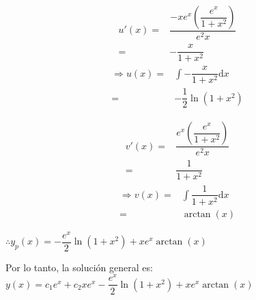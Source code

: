 \documentclass[fleqn]{article}
\begin{document}
\begin{enumerate}
        \begin{minipage}[t]{5cm}
            \begin{align*}
                u'(x) =& \dfrac{-xe^x \left(\dfrac{e^x}{1 + x^2} \right)}{e^2x} \\
                =& -\dfrac{x}{1 + x^2}
            \end{align*}
            \begin{align*}
                \Longrightarrow u(x) =& \int -\dfrac{x}{1 + x^2} \mathrm{d}x \\
                =& -\dfrac{1}{2} \ln (1 + x^2)
            \end{align*}
        \end{minipage} \begin{minipage}[t]{5cm}
            \begin{align*}
                v'(x) =& \dfrac{e^x \left(\dfrac{e^x}{1 + x^2} \right)}{e^2x} \\
                =& \dfrac{1}{1 + x^2}
            \end{align*}
            \begin{align*}
                \Longrightarrow v(x) =& \int \dfrac{1}{1 + x^2} \mathrm{d}x \\
                =& \arctan (x)
            \end{align*}
        \end{minipage}

        $ \therefore y_p(x) = -\dfrac{e^x}{2} \ln (1 + x^2) + xe^x \arctan(x) $

        Por lo tanto, la solución general es:
        $ y(x) = c_1e^x + c_2xe^x -\dfrac{e^x}{2} \ln (1 + x^2) + xe^x \arctan(x) $
    \end{enumerate}
\end{document}
